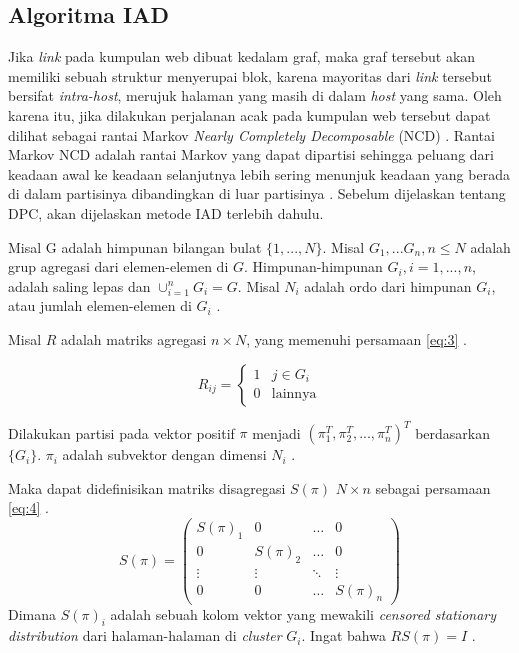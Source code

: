 \subsection{Algoritma IAD}

Jika \textit{link} pada kumpulan web dibuat kedalam graf, maka graf tersebut akan memiliki sebuah struktur menyerupai blok, karena mayoritas dari \textit{link} tersebut bersifat \textit{intra-host}, merujuk halaman yang masih di dalam \textit{host} yang sama. Oleh karena itu, jika dilakukan perjalanan acak pada kumpulan web tersebut dapat dilihat sebagai rantai Markov \textit{Nearly Completely Decomposable} (NCD) \citep{zhuetal2005distributedPagerank}. Rantai Markov NCD adalah rantai Markov yang dapat dipartisi sehingga peluang dari keadaan awal ke keadaan selanjutnya lebih sering menunjuk keadaan yang berada di dalam partisinya dibandingkan di luar partisinya \citep{kontovasilisMitrou1995}. Sebelum dijelaskan tentang DPC, akan dijelaskan metode IAD terlebih dahulu.

Misal G adalah himpunan bilangan bulat $\{1,...,N\}$. Misal $G_1,...G_n, n \leq N$ adalah grup agregasi dari elemen-elemen di $G$. Himpunan-himpunan $G_i, i = 1,...,n$, adalah saling lepas dan $\cup^n_{i=1}G_i=G$. Misal $N_i$ adalah ordo dari himpunan $G_i$, atau jumlah elemen-elemen di $G_i$ \citep{zhuetal2005distributedPagerank}. 

Misal $R$ adalah matriks agregasi $n \times N$, yang memenuhi persamaan \ref{eq:3} \citep{zhuetal2005distributedPagerank}.

\begin{equation}
	\label{eq:3}
	R_{ij}= 
	\begin{cases}
			1 & j \in G_i\\
			0 & \text{lainnya}
	\end{cases}
\end{equation}

Dilakukan partisi pada vektor positif $\pi$ menjadi $(\pi^T_1,\pi^T_2,...,\pi^T_n)^T$ berdasarkan $\{G_i\}$. $\pi_i$ adalah subvektor dengan dimensi $N_i$ \citep{zhuetal2005distributedPagerank}.

Maka dapat didefinisikan matriks disagregasi $S(\pi)$ $N \times n$ sebagai persamaan \ref{eq:4} \citep{zhuetal2005distributedPagerank}.
\begin{equation}
	\label{eq:4}
	S(\pi) = 
	\begin{pmatrix}
		S(\pi)_1 & 0 & \ldots & 0 \\
		0 & S(\pi)_2 & \ldots & 0 \\
		\vdots & \vdots & \ddots & \vdots \\
		0 & 0 & \ldots & S(\pi)_n
	\end{pmatrix}
\end{equation}
Dimana $S(\pi)_i$ adalah sebuah kolom vektor yang mewakili \textit{censored stationary distribution} dari halaman-halaman di \textit{cluster} $G_i$. Ingat bahwa $RS(\pi) = I$ \citep{zhuetal2005distributedPagerank}.

